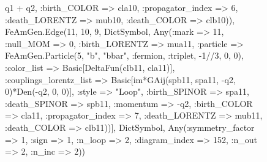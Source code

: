 \documentclass{revtex4}
\begin{document}
\begin{figure}[!htb]
\begin{center}
{q1 + q2, :birth_COLOR => cla10, :propagator_index => 6, :death_LORENTZ => mub10, :death_COLOR => clb10)), FeAmGen.Edge(11, 10, 9, Dict{Symbol, Any}(:mark => 11, :null_MOM => 0, :birth_LORENTZ => mua11, :particle => FeAmGen.Particle(5, "b", "bbar", :fermion, :triplet, -1//3, 0, 0), :color_list => Basic[DeltaFun(clb11, cla11)], :couplings_lorentz_list => Basic[im*GAij(spb11, spa11, -q2, 0)*Den(-q2, 0, 0)], :style => "Loop", :birth_SPINOR => spa11, :death_SPINOR => spb11, :momentum => -q2, :birth_COLOR => cla11, :propagator_index => 7, :death_LORENTZ => mub11, :death_COLOR => clb11))], Dict{Symbol, Any}(:symmetry_factor => 1, :sign => 1, :n_loop => 2, :diagram_index => 152, :n_out => 2, :n_inc => 2)) 
}
\end{center}
\end{figure}
\end{document}
